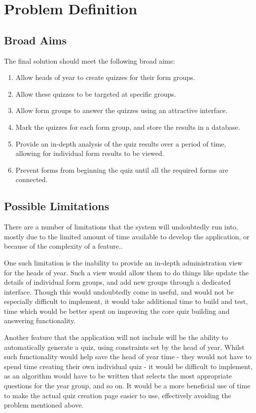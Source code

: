 \section{Problem Definition}

\subsection{Broad Aims}
The final solution should meet the following broad aims:

\begin{enumerate}
	\item Allow heads of year to create quizzes for their form groups.
	\item Allow these quizzes to be targeted at specific groups.
	\item Allow form groups to answer the quizzes using an attractive interface.
	\item Mark the quizzes for each form group, and store the results in a database.
	\item Provide an in-depth analysis of the quiz results over a period of time, allowing for individual form results to be viewed.
	\item Prevent forms from beginning the quiz until all the required forms are connected.
\end{enumerate}

\subsection{Possible Limitations}
There are a number of limitations that the system will undoubtedly run into, mostly due to the limited amount of time available to develop the application, or because of the complexity of a feature..

One such limitation is the inability to provide an in-depth administration view for the heads of year. Such a view would allow them to do things like update the details of individual form groups, and add new groups through a dedicated interface. Though this would undoubtedly come in useful, and would not be especially difficult to implement, it would take additional time to build and test, time which would be better spent on improving the core quiz building and answering functionality.

Another feature that the application will not include will be the ability to automatically generate a quiz, using constraints set by the head of year. Whilst such functionality would help save the head of year time - they would not have to spend time creating their own individual quiz - it would be difficult to implement, as an algorithm would have to be written that selects the most appropriate questions for the year group, and so on. It would be a more beneficial use of time to make the actual quiz creation page easier to use, effectively avoiding the problem mentioned above.

